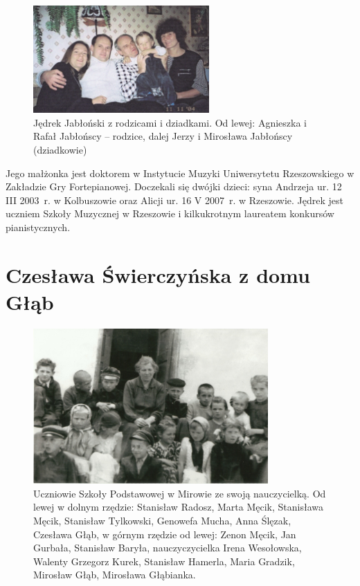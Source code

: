 \begin{figure}[!ht]
\begin{center}
\includegraphics[width=0.6\textwidth]{zdjecia/jedrek_jakblonski_i_rodzina.jpg}
\caption[Jędrek Jabłoński z rodzicami i dziadkami]{Jędrek Jabłoński z rodzicami i dziadkami. Od lewej: Agnieszka i Rafał Jabłońscy -- rodzice, dalej Jerzy i Mirosława Jabłońscy (dziadkowie)}
\label{rys:jedrek_jakblonski_i_rodzina}
\end{center}
\end{figure}

Jego małżonka jest doktorem w Instytucie Muzyki Uniwersytetu Rzeszowskiego w Zakładzie Gry Fortepianowej.  Doczekali się dwójki dzieci: syna Andrzeja ur. 12 III 2003~r. w Kolbuszowie oraz Alicji ur. 16 V 2007~r. w Rzeszowie. Jędrek jest uczniem Szkoły Muzycznej w Rzeszowie i kilkukrotnym laureatem konkursów pianistycznych.





\section{Czesława Świerczyńska z domu Głąb}

\begin{figure}[!h]
\begin{center}
\includegraphics[width=0.8\textwidth]{zdjecia/szkola_w_mirowie.jpg}
\caption[Uczniowie Szkoły Podstawowej w Mirowie]{Uczniowie Szkoły Podstawowej w Mirowie ze swoją nauczycielką. Od lewej w dolnym rzędzie: Stanisław Radosz, Marta Męcik, Stanisława Męcik, Stanisław Tylkowski, Genowefa Mucha, Anna Ślęzak, Czesława Głąb, w górnym rzędzie od lewej: Zenon Męcik, Jan Gurbała, Stanisław Baryła, nauczyczycielka Irena Wesołowska, Walenty Grzegorz Kurek, Stanisław Hamerla, Maria Gradzik, Mirosław Głąb, Mirosława Głąbianka.}
\label{rys:szkola_w_mirowie}
\end{center}
\end{figure}

